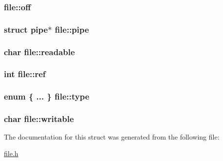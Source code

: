 \subsubsection[{\texorpdfstring{off}{off}}]{ file\+::off}\hypertarget{structfile_a94a911be6cc1b1326728392d8b40150d}{}\label{structfile_a94a911be6cc1b1326728392d8b40150d}
\subsubsection[{\texorpdfstring{pipe}{pipe}}]{\setlength{\rightskip}{0pt plus 5cm}struct {\bf pipe}$\ast$ file\+::pipe}\hypertarget{structfile_a19d83a8d6cb47902fe8c762d2798c198}{}\label{structfile_a19d83a8d6cb47902fe8c762d2798c198}
\subsubsection[{\texorpdfstring{readable}{readable}}]{\setlength{\rightskip}{0pt plus 5cm}char file\+::readable}\hypertarget{structfile_a0c5c8eced8bc562dbbecc8d450a6b646}{}\label{structfile_a0c5c8eced8bc562dbbecc8d450a6b646}
\subsubsection[{\texorpdfstring{ref}{ref}}]{\setlength{\rightskip}{0pt plus 5cm}int file\+::ref}\hypertarget{structfile_a41c818f828adea488058bca63e4df23f}{}\label{structfile_a41c818f828adea488058bca63e4df23f}
\subsubsection[{\texorpdfstring{type}{type}}]{\setlength{\rightskip}{0pt plus 5cm}enum \{ ... \}   file\+::type}\hypertarget{structfile_a7dee40626182d2568f513525b2e657bb}{}\label{structfile_a7dee40626182d2568f513525b2e657bb}
\subsubsection[{\texorpdfstring{writable}{writable}}]{\setlength{\rightskip}{0pt plus 5cm}char file\+::writable}\hypertarget{structfile_a6e1b641ea1551ac4316a0c11a683df45}{}\label{structfile_a6e1b641ea1551ac4316a0c11a683df45}


The documentation for this struct was generated from the following file\+:\begin{DoxyCompactItemize}
\item 
\hyperlink{file_8h}{file.\+h}\end{DoxyCompactItemize}
